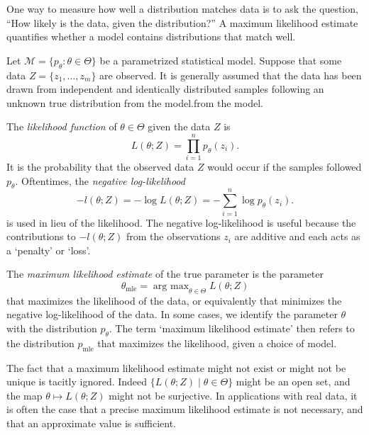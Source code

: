 \documentclass[cclicense]{hmcthesis}
\providecommand*{\ms}{\mathcal M}
\DeclareMathOperator*{\argmax}{arg\ max}
\newcommand*{\mle}{\mathrm{mle}}
\numberwithin{equation}{chapter}
\numberwithin{thmcounter}{chapter}
\begin{document}
    One way to measure how well a distribution matches data is to ask the
    question, ``How likely is the data, given the distribution?''  A maximum
    likelihood estimate quantifies whether a model contains distributions that
    match well.

    Let $\ms = \{p_\theta : \theta \in \Theta\}$ be a parametrized statistical
    model.  Suppose that some data $Z = \{z_1, \ldots, z_m\}$ are observed.  It
    is generally assumed that the data has been drawn from independent and
    identically distributed samples following an unknown true distribution from
    the model.from the model.
    
    \begin{definition}
    The \emph{likelihood function} of $\theta \in \Theta$ given the data $Z$ is
    \[
        L(\theta; Z) = \prod_{i=1}^n p_\theta(z_i).
    \]
    It is the probability that the observed data $Z$ would occur if the samples
    followed $p_\theta$.  Oftentimes, the \emph{negative log-likelihood}
    \begin{equation}
        -l(\theta; Z) = -\log L(\theta; Z) = -\sum_{i=1}^n \log p_\theta(z_i).
        \label{eq:negloglik}
    \end{equation}
    is used in lieu of the likelihood.  The negative log-likelihood is useful
    because the contributions to $-l(\theta; Z)$ from the observations $z_i$ are
    additive and each acts as a `penalty' or `loss'.
    \end{definition}
    \begin{definition}
    The \emph{maximum likelihood estimate} of the true parameter is the
    parameter 
    \[
        \theta_\mle = \argmax_{\theta \in \Theta} L(\theta; Z)
    \]
    that maximizes the likelihood of the data, or equivalently that minimizes
    the negative log-likelihood of the data.  In some cases, we identify the
    parameter $\theta$ with the distribution $p_\theta$. The term `maximum
    likelihood estimate' then refers to the distribution $p_\mle$ that maximizes
    the likelihood, given a choice of model.
    \end{definition}

    \begin{note}
        The fact that a maximum likelihood estimate might not exist or might not
        be unique is tacitly ignored.  Indeed $\{L(\theta; Z) \mid \theta \in
        \Theta\}$ might be an open set, and the map $\theta \mapsto L(\theta;
        Z)$ might not be surjective.  In applications with real data, it is
        often the case that a precise maximum likelihood estimate is not
        necessary, and that an approximate value is sufficient.
    \end{note}
\end{document}
